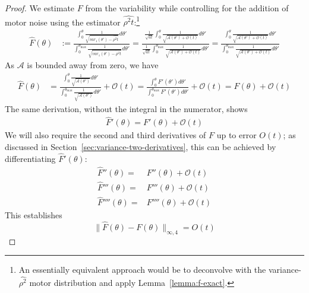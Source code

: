 \begin{proof}
We estimate $F$ from the variability while controlling for the addition of motor noise using the estimator $\widehat{\rho^2t}$:\footnote{An essentially equivalent approach would be to deconvolve with the variance-$\widehat{\rho^2}$ motor distribution and apply Lemma~\ref{lemma:f-exact}.}
    \begin{align*}
        \widehat{F}(\theta) & := \frac{\int_{0}^{\theta}\frac{1}{\sqrt{var_1(\theta') - \widehat{\rho^2t}}} d \theta'}{\int_{0}^{\theta_{\max}}\frac{1}{\sqrt{var_1(\theta') - \widehat{\rho^2t}}}d \theta'} 
        = \frac{\frac{1}{\sqrt{at}}\int_{0}^{\theta}\frac{1}{\sqrt{\mathcal{A}(\theta') + \mathcal{O}(t)}}d \theta'}{\frac{1}{\sqrt{at}}\int_{0}^{\theta_{\max}}\frac{1}{\sqrt{\mathcal{A}(\theta') + \mathcal{O}(t)}}d \theta'}
        = \frac{\int_{0}^{\theta}\frac{1}{\sqrt{\mathcal{A}(\theta') + \mathcal{O}(t)}} d \theta'}{\int_{0}^{\theta_{\max}}\frac{1}{\sqrt{\mathcal{A}(\theta') + \mathcal{O}(t)}}d \theta'}
        \end{align*}
        As $\mathcal{A}$ is bounded away from zero, we have
        \begin{align*}
             \widehat{F}(\theta) & =    \frac{\int_{0}^{\theta}\frac{1}{\sqrt{\mathcal{A}(\theta')}} d \theta'}{\int_{0}^{\theta_{\max}}\frac{1}{\sqrt{\mathcal{A}(\theta')}}d \theta'} + \mathcal{O}(t) 
           =    \frac{\int_{0}^{\theta} F'(\theta') d \theta'}{\int_{0}^{\theta_{\max}} F'(\theta') d \theta'} + \mathcal{O}(t) 
           = F(\theta)  + \mathcal{O}(t)
        \end{align*}
The same derivation, without the integral in the numerator, shows
\begin{align*}
    \widehat{F}'(\theta)  = F'(\theta)  + \mathcal{O}(t)
\end{align*}
We will also require the second and third derivatives of $F$ up to error $O(t)$; as discussed in Section~\ref{sec:variance-two-derivatives}, this can be achieved by differentiating $\widehat{F}'(\theta)$:
\begin{align*}
    \widehat{F}''(\theta)  =& F''(\theta)  + \mathcal{O}(t) \\
    \widehat{F}'''(\theta)  =& F'''(\theta)  + \mathcal{O}(t) \\
    \widehat{F}''''(\theta)  =& F''''(\theta)  + \mathcal{O}(t) 
\end{align*}
This establishes
\begin{equation}
        \|\widehat{F}(\theta) - F(\theta)\|_{\infty,4} = O(t)
\end{equation}

\end{proof}
